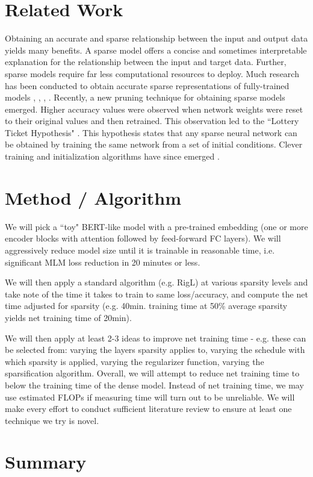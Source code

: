 \documentclass{article}
\begin{document}
\section*{Related Work}
Obtaining an accurate and sparse relationship between the input and output data yields many benefits. A sparse model offers a concise and sometimes interpretable explanation for the relationship between the input and target data. Further, sparse models require far less computational resources to deploy. Much research has been conducted to obtain accurate sparse representations of fully-trained models \cite{han}, \cite{lecun-90b}, \cite{lin}, \cite{li}. Recently, a new pruning technique for obtaining sparse models emerged. Higher accuracy values were observed when network weights were reset to their original values and then retrained. This observation led to the ``Lottery Ticket Hypothesis" \cite{frankle}. This hypothesis states that any sparse neural network can be obtained by training the same network from a set of initial conditions. Clever training and initialization algorithms have since emerged \cite{elsen}. 

\section*{Method / Algorithm}

We will pick a ``toy" BERT-like model with a pre-trained embedding (one or more encoder blocks with attention followed by feed-forward FC layers). We will aggressively reduce model size until it is trainable in reasonable time, i.e. significant MLM loss reduction in 20 minutes or less.

We will then apply a standard algorithm (e.g. RigL) at various sparsity levels and take note of the time it takes to train to same loss/accuracy, and compute the net time adjusted for sparsity (e.g. 40min. training time at 50\% average sparsity yields net training time of 20min).

We will then apply at least 2-3 ideas to improve net training time - e.g. these can be selected from: varying the layers sparsity applies to, varying the schedule with which sparsity is applied, varying the regularizer function, varying the sparsification algorithm. Overall, we will attempt to reduce net training time to below the training time of the dense model. Instead of net training time, we may use estimated FLOPs if measuring time will turn out to be unreliable. We will make every effort to conduct sufficient literature review to ensure at least one technique we try is novel. 

\section*{Summary}


\end{document}
